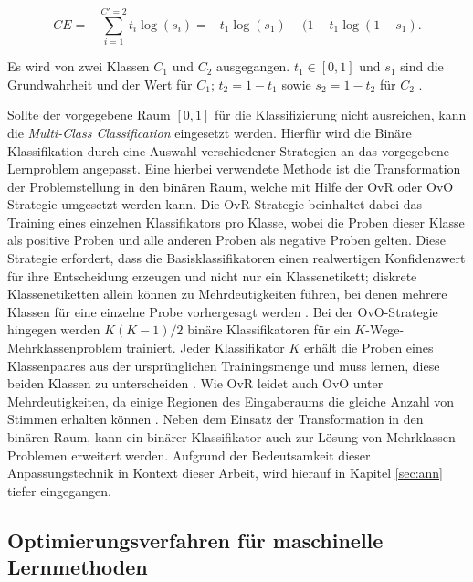 \begin{equation}
	CE = - \sum_{i=1}^{C'=2}{t_i \log(s_i) = -t_1 \log(s_1) - (1-t_1} \log(1-s_1).
\end{equation}

Es wird von zwei Klassen $C_1$ und $C_2$ ausgegangen. $t_1 \in [0,1]$ und $s_1$ sind die Grundwahrheit und der Wert für $C_1$; $t_2 = 1 - t_1$ sowie $s_2 = 1 - t_2$ für $C_2$ \cite{rubinstein2014cross}.

Sollte der vorgegebene Raum $[0,1]$ für die Klassifizierung nicht ausreichen, kann die \emph{Multi-Class Classification} eingesetzt werden. Hierfür wird die Binäre Klassifikation durch eine Auswahl verschiedener Strategien an das vorgegebene Lernproblem angepasst. Eine hierbei verwendete Methode ist die Transformation der Problemstellung in den binären Raum, welche mit Hilfe der \ac{OvR} oder \ac{OvO} Strategie umgesetzt werden kann. Die \ac{OvR}-Strategie beinhaltet dabei das Training eines einzelnen Klassifikators pro Klasse, wobei die Proben dieser Klasse als positive Proben und alle anderen Proben als negative Proben gelten. Diese Strategie erfordert, dass die Basisklassifikatoren einen realwertigen Konfidenzwert für ihre Entscheidung erzeugen und nicht nur ein Klassenetikett; diskrete Klassenetiketten allein können zu Mehrdeutigkeiten führen, bei denen mehrere Klassen für eine einzelne Probe vorhergesagt werden \cite[182]{Bishop2006}. Bei der \ac{OvO}-Strategie hingegen werden $K(K-1)/2$ binäre Klassifikatoren für ein $K$-Wege-Mehrklassenproblem trainiert. Jeder Klassifikator $K$ erhält die Proben eines Klassenpaares aus der ursprünglichen Trainingsmenge und muss lernen, diese beiden Klassen zu unterscheiden \cite[339]{Bishop2006}. Wie OvR leidet auch OvO unter Mehrdeutigkeiten, da einige Regionen des Eingaberaums die gleiche Anzahl von Stimmen erhalten können \cite[183]{Bishop2006}. 
Neben dem Einsatz der Transformation in den binären Raum, kann ein binärer Klassifikator auch zur Lösung von Mehrklassen Problemen erweitert werden. Aufgrund der Bedeutsamkeit dieser Anpassungstechnik in Kontext dieser Arbeit, wird hierauf in Kapitel \ref{sec:ann} tiefer eingegangen.



\subsection*{Optimierungsverfahren für maschinelle Lernmethoden}\label{sec:optimize}

